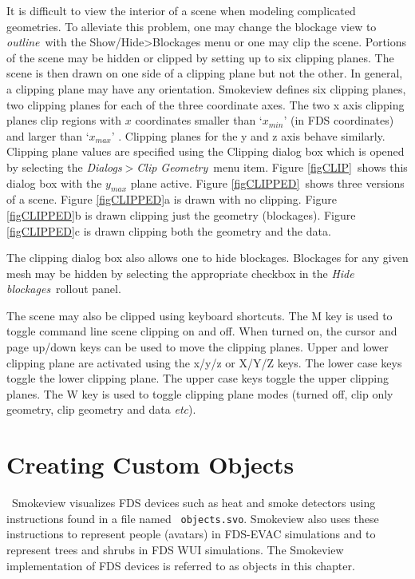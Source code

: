 \documentclass[11pt,twoside]{book}
\begin{document}
It is difficult to view the interior of a scene when modeling
complicated geometries.  To alleviate this problem, one may change the blockage view
to {\em outline}\ with the Show/Hide>Blockages menu or one may clip the scene.
Portions of
the scene may be hidden or clipped by setting up to six clipping
planes. The scene is then drawn on one side of a clipping plane but
not the other. In general, a clipping plane may have any
orientation. Smokeview defines six clipping planes, two clipping planes for each of the
three coordinate axes.   The two x axis clipping planes clip
regions with $x$ coordinates smaller than `$x_{min}$' (in FDS coordinates) and larger than `$x_{max}$' .
Clipping planes for the y and z axis behave similarly.
Clipping plane values are
specified using the Clipping dialog box which is opened by
selecting the {\em Dialogs$>$Clip Geometry}\ menu item. Figure
\ref{figCLIP}\ shows this dialog box with the $y_{max}$ plane
active. Figure \ref{figCLIPPED}\ shows three versions of a scene.
Figure \ref{figCLIPPED}a is drawn with no clipping. Figure
\ref{figCLIPPED}b is drawn clipping just the geometry (blockages).
Figure \ref{figCLIPPED}c is drawn clipping both the geometry and
the data.

The clipping dialog box also allows one to hide blockages.  Blockages for any given mesh may be hidden
by selecting the appropriate checkbox in the {\em Hide blockages}\ rollout panel.

The scene may also be clipped using keyboard shortcuts.
The M key is used to toggle command line scene clipping on and off.  When turned on, the
cursor and page up/down keys can be used to move the clipping planes.
Upper and lower clipping plane are activated using the x/y/z or X/Y/Z keys.
The lower case keys toggle the lower clipping plane.  The upper case
keys toggle the upper clipping planes.
The W key is used to toggle clipping plane modes (turned off, clip only geometry, clip geometry and data
{\em etc}).



\chapter{Creating Custom Objects}
\label{chap:devices}\ Smokeview visualizes FDS devices such as heat
and smoke detectors using instructions found in a file named {\tt
objects.svo}. Smokeview also uses these instructions to represent
people (avatars) in FDS-EVAC simulations and to represent trees
and shrubs in FDS WUI simulations. The Smokeview implementation of
FDS devices is referred to as objects in this chapter.
\end{document}
